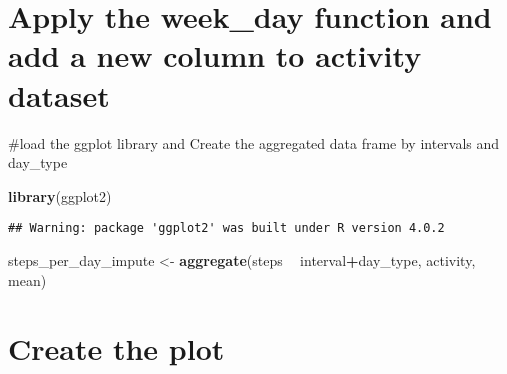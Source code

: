 \documentclass[
]{article}
\newenvironment{Shaded}{\begin{snugshade}}{\end{snugshade}}
\newcommand{\KeywordTok}[1]{\textcolor[rgb]{0.13,0.29,0.53}{\textbf{#1}}}
\newcommand{\NormalTok}[1]{#1}
\newcommand{\OperatorTok}[1]{\textcolor[rgb]{0.81,0.36,0.00}{\textbf{#1}}}
\newcommand{\StringTok}[1]{\textcolor[rgb]{0.31,0.60,0.02}{#1}}
\begin{document}
\hypertarget{apply-the-week_day-function-and-add-a-new-column-to-activity-dataset}{%
\section{Apply the week\_day function and add a new column to activity
dataset}\label{apply-the-week_day-function-and-add-a-new-column-to-activity-dataset}}

\begin{Shaded}
\end{Shaded}

\#load the ggplot library and Create the aggregated data frame by
intervals and day\_type

\begin{Shaded}
\begin{Highlighting}[]
\KeywordTok{library}\NormalTok{(ggplot2)}
\end{Highlighting}
\end{Shaded}

\begin{verbatim}
## Warning: package 'ggplot2' was built under R version 4.0.2
\end{verbatim}

\begin{Shaded}
\begin{Highlighting}[]
\NormalTok{steps_per_day_impute <-}\StringTok{ }\KeywordTok{aggregate}\NormalTok{(steps }\OperatorTok{~}\StringTok{ }\NormalTok{interval}\OperatorTok{+}\NormalTok{day_type, activity, mean)}
\end{Highlighting}
\end{Shaded}

\hypertarget{create-the-plot}{%
\section{Create the plot}\label{create-the-plot}}
\end{document}
